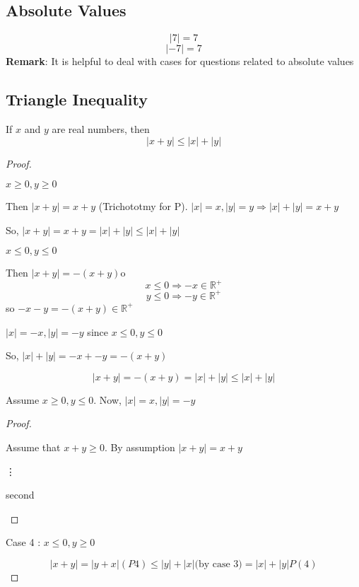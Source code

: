\documentclass{report}
\begin{document}
  \subsection*{Absolute Values}%
  \ex{} {
    \[ |7| = 7 \]
    \[ |-7| = 7 \]
  }
  \textbf{Remark}: It is helpful to deal with cases for questions related to absolute values

  \subsection*{Triangle Inequality}%
   {
    If $x$  and $y$ are real numbers, then
    \[ |x+y| \leq |x| + |y| \]
  }
  \begin{proof}
    \begin{case}
      $x \geq 0, y \geq 0$

      Then $|x+y| = x+y$ (Trichototmy for P).  $|x| = x, |y|=y \Rightarrow |x|+|y| = x+y$

      So, $|x+y| = x+y = |x|+|y| \leq |x|+|y|$
    \end{case}
    \begin{case}
      $x \leq 0, y \leq 0$

      Then $|x+y| = -(x+y)$o
      \[ x \leq 0 \Rightarrow  -x \in \mathbb{R}^+ \]
      \[ y \leq 0 \Rightarrow  -y \in \mathbb{R}^+ \]
      so $-x-y = -(x+y) \in \mathbb{R}^+$

      $|x| = -x, |y|=-y$ since $x \leq 0, y \leq 0$

      So, $|x|+|y| = -x + -y = -(x+y)$

      \[ |x+y| = -(x+y) = |x| + |y| \leq |x| + |y| \]
    \end{case}
    \begin{case}
      Assume $x \geq 0, y \leq 0$.  Now, $|x| = x, |y| = -y$
      \begin{proof}
        \begin{case}
          Assume that $x+y \geq 0$.  By assumption $|x+y| = x+y$

          \vdots
        \end{case}
        \begin{case}
          second

        \end{case}
      \end{proof}

    \end{case}
    Case 4 : $ x \leq 0, y \geq 0$

    \[ |x+y|=|y+x| (P4) \leq |y|+|x| \text{(by case 3)} = |x| + |y| P(4)\]
  \end{proof}
\end{document}
